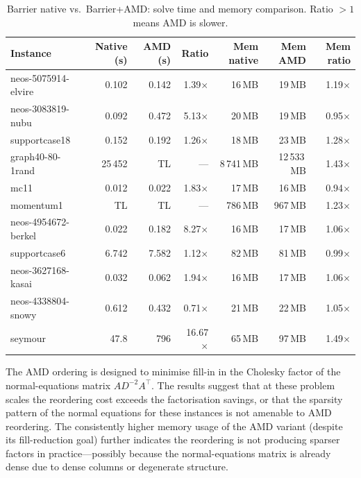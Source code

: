 \documentclass[11pt,a4paper]{article}
\begin{document}
\begin{table}[h]
\centering
\caption{Barrier native vs.\ Barrier+AMD: solve time and memory comparison.
         Ratio $>1$ means AMD is slower.}
\label{tab:native_vs_amd}
\setlength{\tabcolsep}{5pt}
\begin{tabular}{@{}lrrrrrr@{}}
\toprule
\textbf{Instance}
  & \textbf{Native (s)}
  & \textbf{AMD (s)}
  & \textbf{Ratio}
  & \textbf{Mem native}
  & \textbf{Mem AMD}
  & \textbf{Mem ratio} \\
\midrule
neos-5075914-elvire  & 0.102 & 0.142 & 1.39$\times$ & 16\,MB & 19\,MB & 1.19$\times$ \\
neos-3083819-nubu    & 0.092 & 0.472 & 5.13$\times$ & 20\,MB & 19\,MB & 0.95$\times$ \\
supportcase18        & 0.152 & 0.192 & 1.26$\times$ & 18\,MB & 23\,MB & 1.28$\times$ \\
graph40-80-1rand     & 25\,452 & TL  & ---          & 8\,741\,MB & 12\,533\,MB & 1.43$\times$ \\
mc11                 & 0.012 & 0.022 & 1.83$\times$ & 17\,MB & 16\,MB & 0.94$\times$ \\
momentum1            & TL    & TL    & ---          & 786\,MB & 967\,MB & 1.23$\times$ \\
neos-4954672-berkel  & 0.022 & 0.182 & 8.27$\times$ & 16\,MB & 17\,MB & 1.06$\times$ \\
supportcase6         & 6.742 & 7.582 & 1.12$\times$ & 82\,MB & 81\,MB & 0.99$\times$ \\
neos-3627168-kasai   & 0.032 & 0.062 & 1.94$\times$ & 16\,MB & 17\,MB & 1.06$\times$ \\
neos-4338804-snowy   & 0.612 & 0.432 & \cellcolor{bestcell}0.71$\times$ & 21\,MB & 22\,MB & 1.05$\times$ \\
seymour              & 47.8  & 796   & \cellcolor{badcell}16.67$\times$ & 65\,MB & 97\,MB & 1.49$\times$ \\
\bottomrule
\end{tabular}
\end{table}

The AMD ordering is designed to minimise fill-in in the Cholesky factor of
the normal-equations matrix $AD^{-2}A^{\top}$.  The results suggest that at
these problem scales the reordering cost exceeds the factorisation savings,
or that the sparsity pattern of the normal equations for these instances is
not amenable to AMD reordering.  The consistently higher memory usage of the
AMD variant (despite its fill-reduction goal) further indicates the
reordering is not producing sparser factors in practice---possibly because
the normal-equations matrix is already dense due to dense columns or
degenerate structure.
\end{document}
